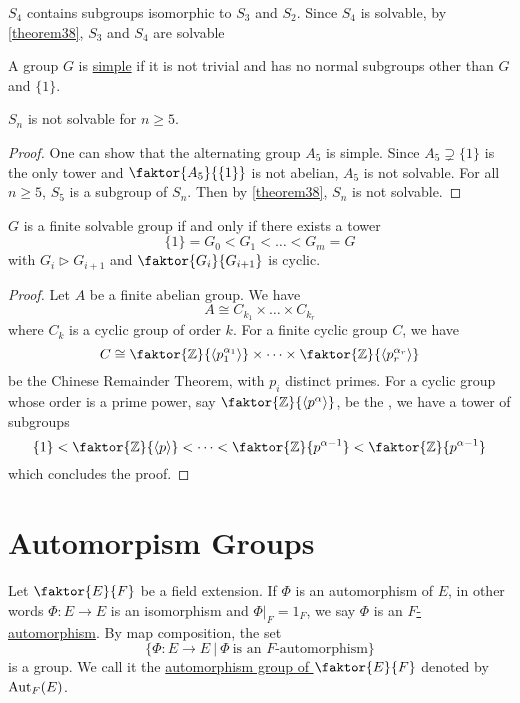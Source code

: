 \documentclass[11pt]{article}
\newcommand{\cyclic}[1]{\left\langle #1 \right\rangle}
\newcommand{\quotient}[2]{\faktor{#1}{#2}}
\begin{document}
\begin{example}
$S_4$ contains subgroups isomorphic to $S_3$ and $S_2$. Since $S_4$ is solvable,
by \cref{theorem38}, $S_3$ and $S_4$ are solvable
\end{example}
\begin{definition}
A group $G$ is \underline{simple} if it is not trivial and has no normal
subgroups other than $G$ and $\{1\}$.
\end{definition}
\begin{remark}
$S_n$ is not solvable for $n \geq 5$.
\end{remark}
\begin{proof}
One can show that the alternating group $A_5$ is simple. Since $A_5 \supsetneq
\{1\}$ is the only tower and $\quotient{A_5}{\{1\}}$ is not abelian, $A_5$
is not solvable. For all $n \geq 5$, $S_5$ is a subgroup of $S_n$. Then by
\cref{theorem38}, $S_n$ is not solvable.
\end{proof}
\begin{corollary}
$G$ is a finite solvable group if and only if there exists a tower
\begin{equation*}
\{1\} = G_0 < G_1 < \dots < G_m = G
\end{equation*}
with $G_{i} \triangleright G_{i+1}$ and $\quotient{G_i}{G_{i+1}}$ is cyclic.
\label{corollary39}
\end{corollary}
\begin{proof}
Let $A$ be a finite abelian group. We have
\begin{equation*}
A \cong C_{k_1} \times \dots \times C_{k_r} 
\end{equation*}
where $C_k$ is a cyclic group of order $k$. For a finite cyclic group $C$, we
have
\begin{equation*}
C \cong \quotient{\Z}{\cyclic{p_1^{\alpha_1}}} \times \dots \times
\quotient{\Z}{\cyclic{p_r^{\alpha_r}}}
\end{equation*}
be the Chinese Remainder Theorem, with $p_i$ distinct primes. For a cyclic group
whose order is a prime power, say $\quotient{\Z}{\cyclic{p^\alpha}}$, be the
, we have a tower of subgroups
\begin{equation*}
\{1\} < \quotient{\Z}{\cyclic{p}} < \dots < \quotient{\Z}{p^{\alpha-1}} <
\quotient{\Z}{p^{\alpha-1}}
\end{equation*}
which concludes the proof.
\end{proof}

\pagebreak
\section{Automorpism Groups}
\begin{definition}
Let $\quotient{E}{F}$ be a field extension. If $\Phi$ is an automorphism of $E$,
in other words $\Phi: E \to E$ is an isomorphism and $\Phi|_F = 1_F$, we say
$\Phi$ is an \underline{$F$-automorphism}. By map composition, the set
\begin{equation*}
\{\Phi:E\to E\>|\>\Phi\>\text{is an }F\text{-automorphism}\}
\end{equation*}
is a group. We call it the \underline{automorphism group of $\quotient{E}{F}$}
denoted by $\operatorname{Aut}_F(E)$.
\end{definition}
\end{document}
